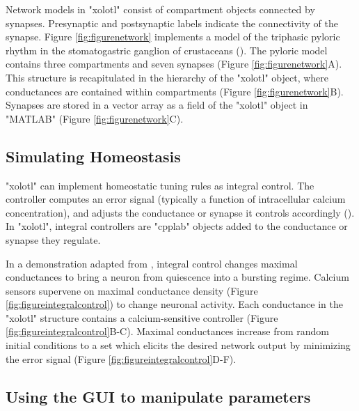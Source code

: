 \documentclass{frontiersSCNS} %
\begin{document}
Network models in "xolotl" consist of compartment objects connected by synapses. Presynaptic and postsynaptic labels indicate the connectivity of the synapse. Figure \ref{fig:figurenetwork} implements a model of the triphasic pyloric rhythm in the stomatogastric ganglion of crustaceans (\cite{prinzSimilarNetworkActivity2004}). The pyloric model contains three compartments and seven synapses (Figure \ref{fig:figurenetwork}A). This structure is recapitulated in the hierarchy of the "xolotl" object, where conductances are contained within compartments (Figure \ref{fig:figurenetwork}B). Synapses are stored in a vector array as a field of the "xolotl" object in "MATLAB" (Figure \ref{fig:figurenetwork}C).

%
%
%
%
%
%

\subsection{Simulating Homeostasis}

"xolotl" can implement homeostatic tuning rules as integral control. The controller computes an error signal (typically a function of intracellular calcium concentration), and adjusts the conductance or synapse it controls accordingly (\cite{olearyCorrelationsIonChannel2013}). In "xolotl", integral controllers are "cpplab" objects added to the conductance or synapse they regulate.

In a demonstration adapted from \cite{olearyCorrelationsIonChannel2013}, integral control changes maximal conductances to bring a neuron from quiescence into a bursting regime. Calcium sensors supervene on maximal conductance density (Figure \ref{fig:figureintegralcontrol}) to change neuronal activity. Each conductance in the "xolotl" structure contains a calcium-sensitive controller (Figure \ref{fig:figureintegralcontrol}B-C). Maximal conductances increase from random initial conditions to a set which elicits the desired network output by minimizing the error signal (Figure \ref{fig:figureintegralcontrol}D-F).

%
%
%
%
%
%

\subsection{Using the GUI to manipulate parameters}
\end{document}
